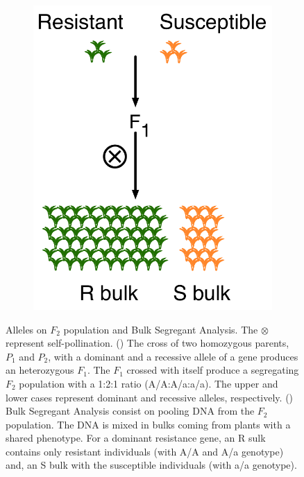 \begin{figure}
\begin{subfigure}{0.5\textwidth}
   \includegraphics[height=0.3\textheight]{Yr15/Figures/BSA.pdf}
  \end{subfigure}
   \caption[Alleles on $F_2$ population and Bulk Segregant Analysis.]{Alleles on $F_2$ population and Bulk Segregant Analysis. The $\otimes$ represent self-pollination. () The cross of two homozygous parents, $P_{1}$ and $P_{2}$, with a dominant and a recessive allele of a gene produces an heterozygous $F_{1}$. The $F_{1}$ crossed with itself produce a segregating $F_{2}$ population with a 1:2:1 ratio (A/A:A/a:a/a). The upper and lower cases represent dominant and recessive alleles, respectively. () Bulk Segregant Analysis consist on pooling DNA from the $F_{2}$ population. The DNA is mixed in bulks coming from plants with a shared phenotype. For a dominant resistance gene, an R sulk contains only resistant individuals (with A/A and A/a genotype) and, an S bulk with the susceptible individuals (with a/a genotype). } 
  
\end{figure}


